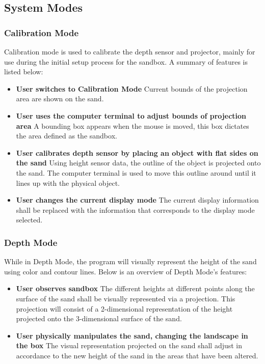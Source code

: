 \documentclass[onecolumn, draftclsnofoot,10pt, compsoc]{IEEEtran}
\begin{document}

\subsection{System Modes}
\subsubsection{Calibration Mode}
Calibration mode is used to calibrate the depth sensor and projector, mainly for use during the initial set\-up process for the sandbox. A summary of features is listed below:

\begin{itemize}
\item \textbf{User switches to Calibration Mode}
Current bounds of the projection area are shown on the sand.

\item \textbf{User uses the computer terminal to adjust bounds of projection area}
A bounding box appears when the mouse is moved, this box dictates the area defined as the sandbox.

\item \textbf{User calibrates depth sensor by placing an object with flat sides on the sand}
Using height sensor data, the outline of the object is projected onto the sand. 
The computer terminal is used to move this outline around until it lines up with the physical object.

\item \textbf{User changes the current display mode}
The current display information shall be replaced with the information that corresponds to the display mode selected.
\end{itemize}

\subsubsection{Depth Mode}
While in Depth Mode, the program will visually represent the height of the sand using color and contour lines. Below is an overview of Depth Mode's features:

\begin{itemize}
\item \textbf{User observes sandbox}
The different heights at different points along the surface of the sand shall be visually represented via a projection.  This projection will consist of a 2-dimensional representation of the height projected onto the 3-dimensional surface of the sand.

\item \textbf{User physically manipulates the sand, changing the landscape in the box}
The visual representation projected on the sand shall adjust in accordance to the new height of the sand in the areas that have been altered. 

\end{itemize}
\end{document}
